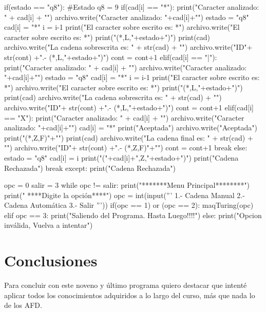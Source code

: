 \documentclass{article}
\begin{document}
\begin{python}
					if(estado == "q8"): #Estado q8 = 9
						if(cad[i] == "*"):
							print("Caracter analizado: " + cad[i] + "\n")
							archivo.write("Caracter analizado: "+cad[i]+"\n")
							estado = "q8"
							cad[i] = "*"
							i = i-1
							print("El caracter sobre escrito es: *\n")
							archivo.write("El caracter sobre escrito es: *\n")
							print("(*,L,"+estado+")\n")
							print(cad)
							archivo.write("La cadena sobrescrita es: " + str(cad) + "\n")
							archivo.write("ID"+ str(cont) +".- (*,L,"+estado+")\n\n")
							cont = cont+1
						elif(cad[i] == "|"):
							print("Caracter analizado: " + cad[i] + "\n")
							archivo.write("Caracter analizado: "+cad[i]+"\n")
							estado = "q8"
							cad[i] = "*"
							i = i-1
							print("El caracter sobre escrito es: *\n")
							archivo.write("El caracter sobre escrito es: *\n")
							print("(*,L,"+estado+")\n")
							print(cad)
							archivo.write("La cadena sobrescrita es: " + str(cad) + "\n")
							archivo.write("ID"+ str(cont) +".- (*,L,"+estado+")\n\n")
							cont = cont+1
						elif(cad[i] == "X"):
							print("Caracter analizado: " + cad[i] + "\n")
							archivo.write("Caracter analizado: "+cad[i]+"\n")
							cad[i] = "*"
							print("\nCadena Aceptada\n")
							archivo.write("\nCadena Aceptada\n")
							print("(*,Z,F)"+"\n")
							print(cad)
							archivo.write("La cadena final es: " + str(cad) + "\n")
							archivo.write("ID"+ str(cont) +".- (*,Z,F)"+"\n\n")
							cont = cont+1
							break
						else:
							estado = "q8"
							cad[i] = i
							print("("+cad[i]+",Z,"+estado+")\n")
							print("Cadena Rechazada")
							break 
			except:
				print("Cadena Rechazada")
		
		opc = 0
		salir = 3
		while opc != salir:
			print("\n\n********Menu Principal********\n\n")
			print("   ****Digite la opción****")
			opc = int(input('''
			1.- Cadena Manual
			2.- Cadena Automática
			3.- Salir
			'''))    
			if(opc == 1) or (opc == 2):
				maqTuring(opc)
			elif opc == 3:
				print("Saliendo del Programa. Hasta Luego!!!!")
			else:
				print("Opcion inválida, Vuelva a intentar")
	\end{python}
	
	\section*{Conclusiones}
	Para concluir con este noveno y último programa quiero destacar que intenté aplicar todos los conocimientos adquiridos a lo largo del curso, más que nada lo de los AFD.
	
\end{document}
